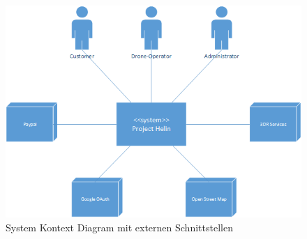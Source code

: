 \begin{figure}[h]
\includegraphics[width=1.0\textwidth]{images/system-context-diagram.png}
\caption{System Kontext Diagram mit externen Schnittstellen }
\label{fig:system-context-diagram}
\end{figure}









